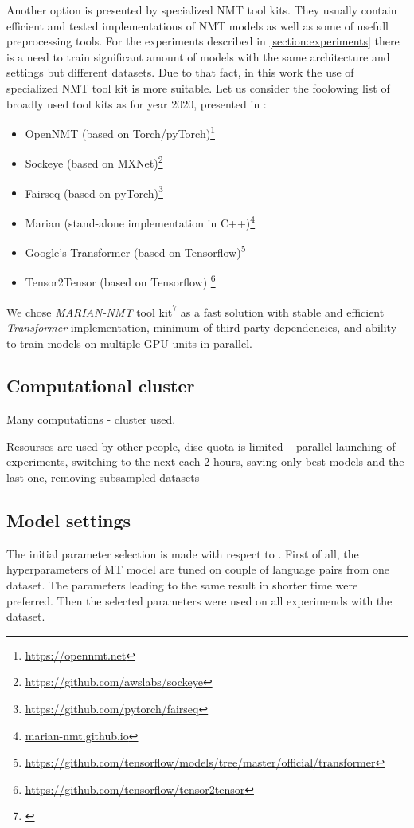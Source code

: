 Another option is presented by specialized NMT tool kits.
They usually contain efficient and tested implementations of NMT models as well as some of
usefull preprocessing tools.
For the experiments described in \ref{section:experiments} there is a need to train significant
amount of models with the same architecture and settings but different datasets.
Due to that fact, in this work the use of specialized NMT tool kit is more suitable.
Let us consider the foolowing list of broadly used tool kits as for year 2020,
presented in \cite{koehn_2020}:

\begin{itemize}
  \item OpenNMT (based on Torch/pyTorch)\footnote{\url{https://opennmt.net}}
  \item Sockeye (based on MXNet)\footnote{\url{https://github.com/awslabs/sockeye}}
  \item Fairseq (based on pyTorch)\footnote{\url{https://github.com/pytorch/fairseq}}
  \item Marian (stand-alone implementation in C++)\footnote{\url{marian-nmt.github.io}}
  \item Google's Transformer (based on Tensorflow)\footnote{\url{
    https://github.com/tensorflow/models/tree/master/official/transformer}}
  \item Tensor2Tensor (based on Tensorflow) \footnote{\url{
    https://github.com/tensorflow/tensor2tensor}}
\end{itemize}

We chose \textit{MARIAN-NMT} tool kit\footnote{\cite{mariannmt}} as a fast solution
with stable and efficient \textit{Transformer} \cite{vaswani-2017-transformer} implementation,
minimum of third-party dependencies, and ability to train models on multiple GPU units in parallel.


\subsection{Computational cluster}

Many computations - cluster used.

Resourses are used by other people, disc quota is limited -- 
parallel launching of experiments, 
switching to the next each 2 hours, 
saving only best models and the last one,
removing subsampled datasets

\subsection{Model settings}

The initial parameter selection is made with respect to \cite{training-tips}.
First of all, the hyperparameters of MT model are tuned
on couple of language pairs from one dataset.
The parameters leading to the same result in shorter time were preferred.
Then the selected parameters were used on all experimends with the dataset.
